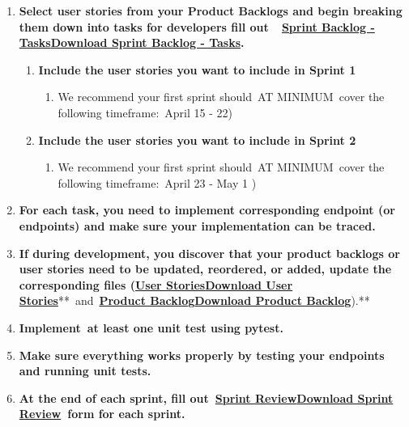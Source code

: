 \documentclass[
]{article}
\providecommand{\tightlist}{%
  \setlength{\itemsep}{0pt}\setlength{\parskip}{0pt}}
\begin{document}
\begin{enumerate}
\def\labelenumi{\arabic{enumi}.}
\item
  \textbf{Select user stories from your Product Backlogs and begin
  breaking them down into tasks for developers fill
  out~~\textbf{\href{https://instructure.charlotte.edu/courses/264138/files/33808466?wrap=1}{\textbf{Sprint
  Backlog -
  Tasks}}\href{https://instructure.charlotte.edu/courses/264138/files/33808466/download?download_frd=1}{\textbf{Download
  Sprint Backlog - Tasks}}}.}

  \begin{enumerate}
  \def\labelenumii{\arabic{enumii}.}
  \tightlist
  \item
    \textbf{Include the user stories you want to include in Sprint 1}

    \begin{enumerate}
    \def\labelenumiii{\arabic{enumiii}.}
    \tightlist
    \item
      We recommend your first sprint should~AT MINIMUM~cover the
      following timeframe:~April 15 - 22)
    \end{enumerate}
  \item
    \textbf{Include the user stories you want to include in Sprint 2}

    \begin{enumerate}
    \def\labelenumiii{\arabic{enumiii}.}
    \tightlist
    \item
      We recommend your first sprint should~AT MINIMUM~cover the
      following timeframe:~April 23 - May 1 )
    \end{enumerate}
  \end{enumerate}
\item
  \textbf{For each task, you need to implement corresponding endpoint
  (or endpoints) and make sure your implementation can be traced.}
\item
  \textbf{If during development, you discover that your product backlogs
  or user stories need to be updated, reordered, or added, update the
  corresponding files
  (}\href{https://instructure.charlotte.edu/courses/264138/files/33808471?wrap=1}{\textbf{User
  Stories}}\href{https://instructure.charlotte.edu/courses/264138/files/33808471/download?download_frd=1}{\textbf{Download
  User
  Stories}}**~and~\textbf{\href{https://instructure.charlotte.edu/courses/264138/files/33808457?wrap=1}{\textbf{Product
  Backlog}}\href{https://instructure.charlotte.edu/courses/264138/files/33808457/download?download_frd=1}{\textbf{Download
  Product Backlog}}}).**
\item
  \textbf{Implement~at least one unit test using pytest.}
\item
  \textbf{Make sure everything works properly by testing your endpoints
  and running unit tests.}
\item
  \textbf{At the end of each sprint, fill
  out~\textbf{\href{https://instructure.charlotte.edu/courses/264138/files/33808472?wrap=1}{\textbf{Sprint
  Review}}\href{https://instructure.charlotte.edu/courses/264138/files/33808472/download?download_frd=1}{\textbf{Download
  Sprint Review}}}~form for each sprint.}
\end{enumerate}
\end{document}
